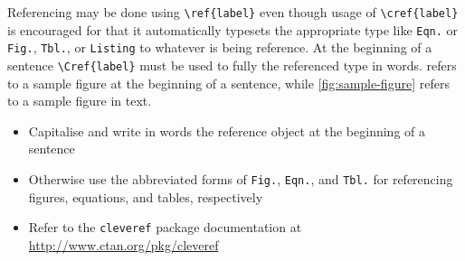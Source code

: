 \documentclass[%
    thesis=ma, %
    language=american, %
    paper=a4,%
    online,
    final,
]{isw}
\begin{document}
    Referencing may be done using \verb|\ref{label}| even though usage of \verb|\cref{label}| is encouraged for that it automatically typesets the appropriate type like \texttt{Eqn.} or \texttt{Fig.}, \texttt{Tbl.}, or \texttt{Listing} to whatever is being reference. At the beginning of a sentence \verb|\Cref{label}| must be used to fully the referenced type in words.  refers to a sample figure at the beginning of a sentence, while \cref{fig:sample-figure} refers to a sample figure in text.
    
    \begin{itemize}
        \item Capitalise and write in words the reference object at the beginning of a sentence
        \item Otherwise use the abbreviated forms of \texttt{Fig.}, \texttt{Eqn.}, and \texttt{Tbl.} for referencing figures, equations, and tables, respectively
        \item Refer to the \verb|cleveref| package documentation at \url {http://www.ctan.org/pkg/cleveref}
    \end{itemize}
    
\end{document}
